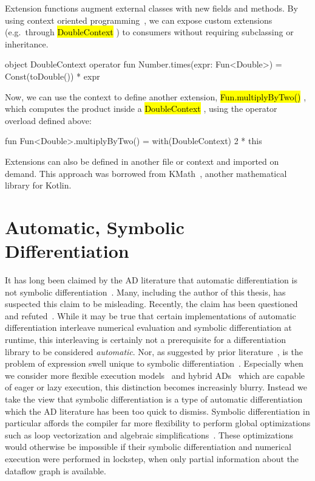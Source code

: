 \documentclass[12pt,initial,twoside,maitrise]{dms}
\newcommand{\inline}[1]{%
\begingroup%
\sethlcolor{slightgray}%
\hl{\ttfamily\small #1}%
\endgroup
}
\numberwithin{equation}{section}
\numberwithin{table}{chapter}
\numberwithin{figure}{chapter}
\begin{document}
Extension functions augment external classes with new fields and methods. By using context oriented programming~\citep{hirschfeld2008context}, we can expose custom extensions (e.g.\ through \inline{DoubleContext}) to consumers without requiring subclassing or inheritance.
%
\begin{kotlinlisting}[caption={We can provide numerical extensions, wrapped in a context.}]
object DoubleContext {
    operator fun Number.times(expr: Fun<Double>) = Const(toDouble()) * expr
}
\end{kotlinlisting}
%
Now, we can use the context to define another extension, \inline{Fun.multiplyByTwo()}, which computes the product inside a \inline{DoubleContext}, using the operator overload defined above:
%
\begin{kotlinlisting}
fun Fun<Double>.multiplyByTwo() = with(DoubleContext) { 2 * this }
\end{kotlinlisting}
%
Extensions can also be defined in another file or context and imported on demand. This approach was borrowed from KMath~\citep{nozik2019acat}, another mathematical library for Kotlin.

\section{Automatic, Symbolic Differentiation}

It has long been claimed by the AD literature that automatic differentiation is not symbolic differentiation~\citep{baydin-survey}. Many, including the author of this thesis, has suspected this claim to be misleading. Recently, the claim has been questioned~\citep{wang2018demystifying} and refuted~\citep{laue2019equivalence}. While it may be true that certain implementations of automatic differentiation interleave numerical evaluation and symbolic differentiation at runtime, this interleaving is certainly not a prerequisite for a differentiation library to be considered \textit{automatic}. Nor, as suggested by prior literature~\citep{baydin2014ad}, is the problem of expression swell unique to symbolic differentiation~\citep{laue2019equivalence}. Especially when we consider more flexible execution models~\citep{wang2018demystifying} and hybrid ADs~\citep{abadi2016tensorflow} which are capable of eager or lazy execution, this distinction becomes increasinly blurry. Instead we take the view that symbolic differentiation is a type of automatic differentiation which the AD literature has been too quick to dismiss. Symbolic differentiation in particular affords the compiler far more flexibility to perform global optimizations such as loop vectorization and algebraic simplifications~\citep{theano}. These optimizations would otherwise be impossible if their symbolic differentiation and numerical execution were performed in lockstep, when only partial information about the dataflow graph is available.
\end{document}
